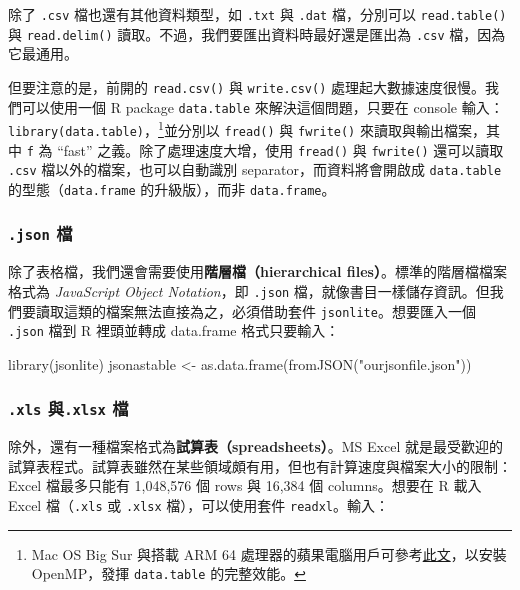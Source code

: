 \documentclass[
]{book}
\newenvironment{Shaded}{\begin{snugshade}}{\end{snugshade}}
\newcommand{\FunctionTok}[1]{\textcolor[rgb]{0.00,0.00,0.00}{#1}}
\newcommand{\NormalTok}[1]{#1}
\newcommand{\OtherTok}[1]{\textcolor[rgb]{0.56,0.35,0.01}{#1}}
\newcommand{\StringTok}[1]{\textcolor[rgb]{0.31,0.60,0.02}{#1}}
\let\oldfootnote\footnote
\renewcommand\footnote[1]{\oldfootnote{%
\renewcommand\baselinestretch{1.1}%
\large\footnotesize\ignorespaces#1}}
\theoremstyle{definition}
\theoremstyle{remark}
\begin{document}
除了 \texttt{.csv} 檔也還有其他資料類型，如 \texttt{.txt} 與 \texttt{.dat} 檔，分別可以 \texttt{read.table()} 與 \texttt{read.delim()} 讀取。不過，我們要匯出資料時最好還是匯出為 \texttt{.csv} 檔，因為它最通用。

但要注意的是，前開的 \texttt{read.csv()} 與 \texttt{write.csv()} 處理起大數據速度很慢。我們可以使用一個 R package \texttt{data.table} 來解決這個問題，只要在 console 輸入：\texttt{library(data.table)}，\footnote{Mac OS Big Sur 與搭載 ARM 64 處理器的蘋果電腦用戶可參考\href{https://www.ptt.cc/bbs/R_Language/M.1626724798.A.3C7.html}{此文}，以安裝 OpenMP，發揮 \texttt{data.table} 的完整效能。}並分別以 \texttt{fread()} 與 \texttt{fwrite()} 來讀取與輸出檔案，其中 \texttt{f} 為 ``fast'' 之義。除了處理速度大增，使用 \texttt{fread()} 與 \texttt{fwrite()} 還可以讀取 \texttt{.csv} 檔以外的檔案，也可以自動識別 separator，而資料將會開啟成 \texttt{data.table} 的型態（\texttt{data.frame} 的升級版），而非 \texttt{data.frame}。

\hypertarget{json-ux6a94}{%
\subsubsection{\texorpdfstring{\texttt{.json} 檔}{.json 檔}}\label{json-ux6a94}}

除了表格檔，我們還會需要使用\textbf{階層檔（hierarchical files）}。標準的階層檔檔案格式為 \emph{JavaScript Object Notation}，即 \texttt{.json} 檔，就像書目一樣儲存資訊。但我們要讀取這類的檔案無法直接為之，必須借助套件 \texttt{jsonlite}。想要匯入一個 \texttt{.json} 檔到 R 裡頭並轉成 data.frame 格式只要輸入：

\begin{Shaded}
\begin{Highlighting}[]
\FunctionTok{library}\NormalTok{(jsonlite)}
\NormalTok{jsonastable }\OtherTok{\textless{}{-}} \FunctionTok{as.data.frame}\NormalTok{(}\FunctionTok{fromJSON}\NormalTok{(}\StringTok{"ourjsonfile.json"}\NormalTok{))}
\end{Highlighting}
\end{Shaded}

\hypertarget{xls-ux8207.xlsx-ux6a94}{%
\subsubsection{\texorpdfstring{\texttt{.xls} 與\texttt{.xlsx} 檔}{.xls 與.xlsx 檔}}\label{xls-ux8207.xlsx-ux6a94}}

除外，還有一種檔案格式為\textbf{試算表（spreadsheets）}。MS Excel 就是最受歡迎的試算表程式。試算表雖然在某些領域頗有用，但也有計算速度與檔案大小的限制：Excel 檔最多只能有 1,048,576 個 rows 與 16,384 個 columns。想要在 R 載入 Excel 檔（\texttt{.xls} 或 \texttt{.xlsx} 檔），可以使用套件 \texttt{readxl}。輸入：
\end{document}
